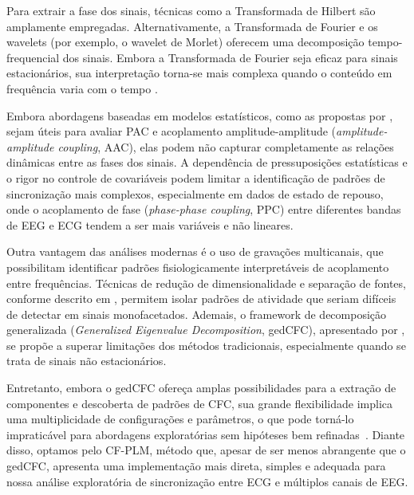 Para extrair a fase dos sinais, técnicas como a Transformada de Hilbert são amplamente empregadas. Alternativamente, a Transformada de Fourier e os wavelets (por exemplo, o wavelet de Morlet) oferecem uma decomposição tempo-frequencial dos sinais. Embora a Transformada de Fourier seja eficaz para sinais estacionários, sua interpretação torna-se mais complexa quando o conteúdo em frequência varia com o tempo \cite{singh2024evaluating}.

Embora abordagens baseadas em modelos estatísticos, como as propostas por , sejam úteis para avaliar PAC e acoplamento amplitude-amplitude (\textit{amplitude-amplitude coupling}, AAC), elas podem não capturar completamente as relações dinâmicas entre as fases dos sinais. A dependência de pressuposições estatísticas e o rigor no controle de covariáveis podem limitar a identificação de padrões de sincronização mais complexos, especialmente em dados de estado de repouso, onde o acoplamento de fase (\textit{phase-phase coupling}, PPC) entre diferentes bandas de EEG e ECG tendem a ser mais variáveis e não lineares.

Outra vantagem das análises modernas é o uso de gravações multicanais, que possibilitam identificar padrões fisiologicamente interpretáveis de acoplamento entre frequências. Técnicas de redução de dimensionalidade e separação de fontes, conforme descrito em , permitem isolar padrões de atividade que seriam difíceis de detectar em sinais monofacetados. Ademais, o framework de decomposição generalizada (\textit{Generalized Eigenvalue Decomposition}, gedCFC), apresentado por , se propõe a superar limitações dos métodos tradicionais, especialmente quando se trata de sinais não estacionários.

Entretanto, embora o gedCFC ofereça amplas possibilidades para a extração de componentes e descoberta de padrões de CFC, sua grande flexibilidade implica uma multiplicidade de configurações e parâmetros, o que pode torná-lo impraticável para abordagens exploratórias sem hipóteses bem refinadas~\cite{cohen2017multivariate}. Diante disso, optamos pelo CF-PLM, método que, apesar de ser menos abrangente que o gedCFC, apresenta uma implementação mais direta, simples e adequada para nossa análise exploratória de sincronização entre ECG e múltiplos canais de EEG.

